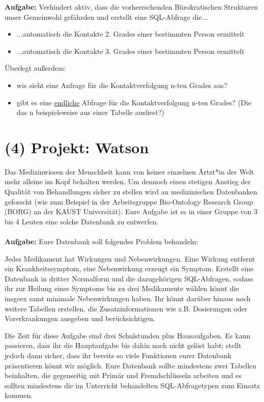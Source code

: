 \documentclass[]{article}
\begin{document}
\textbf{Aufgabe:} Verhindert aktiv, dass die vorherrschenden Bürokratischen Strukturen unser Gemeinwohl gefährden und erstellt eine SQL-Abfrage die...
\begin{itemize}
	\item ...automatisch die Kontakte 2. Grades einer bestimmten Person ermittelt
	\item ...automatisch die Kontakte 3. Grades einer bestimmten Person ermittelt
\end{itemize}
Überlegt außerdem:
\begin{itemize}
	\item wie sieht eine Anfrage für die Kontaktverfolgung n-ten Grades aus?
	\item gibt es eine \underline{endliche} Abfrage für die Kontaktverfolgung n-ten Grades? (Die das n beispielsweise aus einer Tabelle ausliest?)
\end{itemize}


\newpage

\section*{(4) Projekt: Watson}

Das Medizinwissen der Menschheit kann von keiner einzelnen Ärtzt*in der Welt mehr alleine im Kopf behalten werden. Um dennoch einen stetigen Anstieg der Qualität von Behandlungen sicher zu stellen wird an medizinischen Datenbanken geforscht (wie zum Beispiel in der Arbeitsgruppe Bio-Ontology Research Group (BORG) an der KAUST Universität). Eure Aufgabe ist es in einer Gruppe von 3 bis 4 Leuten eine solche Datenbank zu entwerfen. \\\ \\


\textbf{Aufgabe:} Eure Datenbank soll folgendes Problem behandeln:

Jedes Medikament hat Wirkungen und Nebenwirkungen. Eine Wirkung entfernt ein Krankheitssymptom, eine Nebenwirkung erzeugt ein Symptom. Erstellt eine Datenbank in dritter Normalform und die dazugehörigen SQL-Abfragen, sodass ihr zur Heilung eines Symptoms bis zu drei Medikamente wählen könnt die insgeex
samt minimale Nebenwirkungen haben. Ihr könnt darüber hinaus noch weitere Tabellen erstellen, die Zusatzinformationen wie z.B. Dosierungen oder Vorerkrankungen ausgeben und berücksichtigen. 

Die Zeit für diese Aufgabe sind drei Schulstunden plus Hausaufgaben. Es kann passieren, dass ihr die Hauptaufgabe bis dahin noch nicht gelöst habt; stellt jedoch dann sicher, dass ihr bereits so viele Funktionen eurer Datenbank präsentieren könnt wir möglich. Eure Datenbank sollte mindestens zwei Tabellen beinhalten, die gegenseitig mit Primär und Fremdschlüsseln arbeiten und es sollten mindestens die im Unterricht behandelten SQL-Abfragetypen zum Einsatz kommen. 
\end{document}
